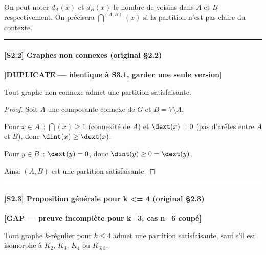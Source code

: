 \begin{remark}
    On peut noter $d_A(x)$ et $d_B(x)$ le nombre de voisins dans $A$ et $B$ respectivement.
    On précisera $\dint^{(A,B)}(x)$ si la partition n'est pas claire du contexte.
\end{remark}

\bigskip\hrule\bigskip

\paragraph{[S2.2] Graphes non connexes (original §2.2)}
\textbf{[DUPLICATE — identique à S3.1, garder une seule version]}

\begin{proposition}
    Tout graphe non connexe admet une partition satisfaisante.
\end{proposition}

\begin{proof}
    Soit $A$ une composante connexe de $G$ et $B = V \setminus A$.

    Pour $x \in A$~: $\dint(x) \geq 1$ (connexité de $A$) et $\dext(x) = 0$ (pas
    d'arêtes entre $A$ et $B$), donc $\dint(x) \geq \dext(x)$.

    Pour $y \in B$~: $\dext(y) = 0$, donc $\dint(y) \geq 0 = \dext(y)$.

    Ainsi $(A, B)$ est une partition satisfaisante.
\end{proof}

\bigskip\hrule\bigskip

\paragraph{[S2.3] Proposition générale pour k <= 4 (original §2.3)}
\textbf{[GAP — preuve incomplète pour k=3, cas n=6 coupé]}

\begin{proposition}
    Tout graphe $k$-régulier pour $k \leq 4$ admet une partition satisfaisante,
    sauf s'il est isomorphe à $K_2$, $K_3$, $K_4$ ou $K_{3,3}$.
\end{proposition}


